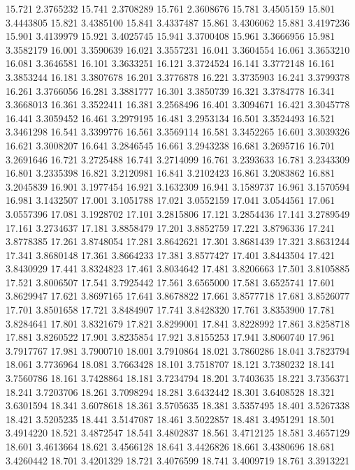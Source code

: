 15.721 2.3765232
15.741 2.3708289
15.761 2.3608676
15.781 3.4505159
15.801 3.4443805
15.821 3.4385100
15.841 3.4337487
15.861 3.4306062
15.881 3.4197236
15.901 3.4139979
15.921 3.4025745
15.941 3.3700408
15.961 3.3666956
15.981 3.3582179
16.001 3.3590639
16.021 3.3557231
16.041 3.3604554
16.061 3.3653210
16.081 3.3646581
16.101 3.3633251
16.121 3.3724524
16.141 3.3772148
16.161 3.3853244
16.181 3.3807678
16.201 3.3776878
16.221 3.3735903
16.241 3.3799378
16.261 3.3766056
16.281 3.3881777
16.301 3.3850739
16.321 3.3784778
16.341 3.3668013
16.361 3.3522411
16.381 3.2568496
16.401 3.3094671
16.421 3.3045778
16.441 3.3059452
16.461 3.2979195
16.481 3.2953134
16.501 3.3524493
16.521 3.3461298
16.541 3.3399776
16.561 3.3569114
16.581 3.3452265
16.601 3.3039326
16.621 3.3008207
16.641 3.2846545
16.661 3.2943238
16.681 3.2695716
16.701 3.2691646
16.721 3.2725488
16.741 3.2714099
16.761 3.2393633
16.781 3.2343309
16.801 3.2335398
16.821 3.2120981
16.841 3.2102423
16.861 3.2083862
16.881 3.2045839
16.901 3.1977454
16.921 3.1632309
16.941 3.1589737
16.961 3.1570594
16.981 3.1432507
17.001 3.1051788
17.021 3.0552159
17.041 3.0544561
17.061 3.0557396
17.081 3.1928702
17.101 3.2815806
17.121 3.2854436
17.141 3.2789549
17.161 3.2734637
17.181 3.8858479
17.201 3.8852759
17.221 3.8796336
17.241 3.8778385
17.261 3.8748054
17.281 3.8642621
17.301 3.8681439
17.321 3.8631244
17.341 3.8680148
17.361 3.8664233
17.381 3.8577427
17.401 3.8443504
17.421 3.8430929
17.441 3.8324823
17.461 3.8034642
17.481 3.8206663
17.501 3.8105885
17.521 3.8006507
17.541 3.7925442
17.561 3.6565000
17.581 3.6525741
17.601 3.8629947
17.621 3.8697165
17.641 3.8678822
17.661 3.8577718
17.681 3.8526077
17.701 3.8501658
17.721 3.8484907
17.741 3.8428320
17.761 3.8353900
17.781 3.8284641
17.801 3.8321679
17.821 3.8299001
17.841 3.8228992
17.861 3.8258718
17.881 3.8260522
17.901 3.8235854
17.921 3.8155253
17.941 3.8060740
17.961 3.7917767
17.981 3.7900710
18.001 3.7910864
18.021 3.7860286
18.041 3.7823794
18.061 3.7736964
18.081 3.7663428
18.101 3.7518707
18.121 3.7380232
18.141 3.7560786
18.161 3.7428864
18.181 3.7234794
18.201 3.7403635
18.221 3.7356371
18.241 3.7203706
18.261 3.7098294
18.281 3.6432442
18.301 3.6408528
18.321 3.6301594
18.341 3.6078618
18.361 3.5705635
18.381 3.5357495
18.401 3.5267338
18.421 3.5205235
18.441 3.5147087
18.461 3.5022857
18.481 3.4951291
18.501 3.4914220
18.521 3.4872547
18.541 3.4802837
18.561 3.4712125
18.581 3.4657129
18.601 3.4613664
18.621 3.4566128
18.641 3.4426826
18.661 3.4380696
18.681 3.4260442
18.701 3.4201329
18.721 3.4076599
18.741 3.4009719
18.761 3.3913221
